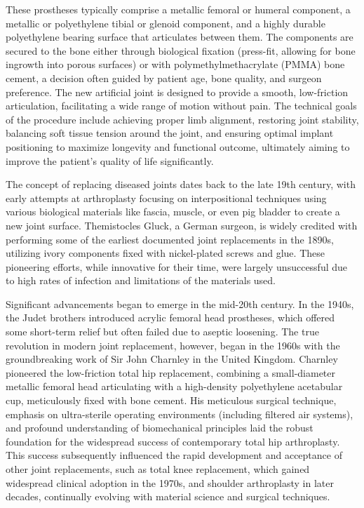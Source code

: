 These prostheses typically comprise a metallic femoral or humeral component, a metallic or polyethylene tibial or glenoid component, and a highly durable polyethylene bearing surface that articulates between them. The components are secured to the bone either through biological fixation (press-fit, allowing for bone ingrowth into porous surfaces) or with polymethylmethacrylate (PMMA) bone cement, a decision often guided by patient age, bone quality, and surgeon preference. The new artificial joint is designed to provide a smooth, low-friction articulation, facilitating a wide range of motion without pain. The technical goals of the procedure include achieving proper limb alignment, restoring joint stability, balancing soft tissue tension around the joint, and ensuring optimal implant positioning to maximize longevity and functional outcome, ultimately aiming to improve the patient's quality of life significantly.

The concept of replacing diseased joints dates back to the late 19th century, with early attempts at arthroplasty focusing on interpositional techniques using various biological materials like fascia, muscle, or even pig bladder to create a new joint surface. Themistocles Gluck, a German surgeon, is widely credited with performing some of the earliest documented joint replacements in the 1890s, utilizing ivory components fixed with nickel-plated screws and glue. These pioneering efforts, while innovative for their time, were largely unsuccessful due to high rates of infection and limitations of the materials used.

Significant advancements began to emerge in the mid-20th century. In the 1940s, the Judet brothers introduced acrylic femoral head prostheses, which offered some short-term relief but often failed due to aseptic loosening. The true revolution in modern joint replacement, however, began in the 1960s with the groundbreaking work of Sir John Charnley in the United Kingdom. Charnley pioneered the low-friction total hip replacement, combining a small-diameter metallic femoral head articulating with a high-density polyethylene acetabular cup, meticulously fixed with bone cement. His meticulous surgical technique, emphasis on ultra-sterile operating environments (including filtered air systems), and profound understanding of biomechanical principles laid the robust foundation for the widespread success of contemporary total hip arthroplasty. This success subsequently influenced the rapid development and acceptance of other joint replacements, such as total knee replacement, which gained widespread clinical adoption in the 1970s, and shoulder arthroplasty in later decades, continually evolving with material science and surgical techniques.

